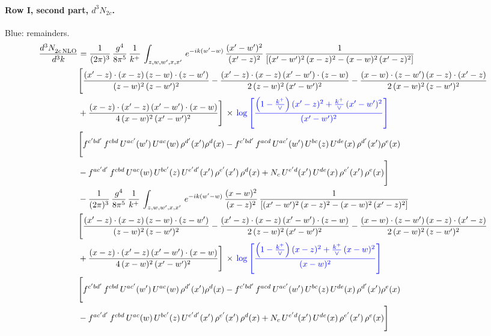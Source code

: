 \documentclass[10pt]{article}
\numberwithin{equation}{section}
\newcommand{\new}[1]{{\color{blue}#1}}
\begin{document}
\paragraph{Row I, second part, $d^3N_{2c}$.}
\new{Blue}: remainders.
\begin{align}
    \frac{d^{3}N_{2c\,\rm NLO}^{\rm}}{d^{3}k}  & =  \frac{1}{(2\pi)^{3}}\, \frac{g^{4}}{8\pi^{5}}\,\frac{1}{k^{+}}\,\int_{z,w,w^{\prime},x,x'}\, e^{-ik(w^{\prime}-w)}\,\frac{(x'-w')^{2}}{(x'-z)^{2}}\, \frac{1}{\left[(x'-w')^{2}\, (x-z)^{2} - (x-w)^{2}\, (x'-z)^{2}\right]} \notag \\ & \Bigg[\frac{(x'-z)\cdot (x-z)\, (z-w)\cdot (z-w')}{(z-w)^{2}\, (z-w')^{2}}-\frac{(x'-z)\cdot (x-z)\, (x'-w')\cdot (z-w)}{2\, (z-w)^{2}\, (x'-w')^{2}} -\frac{(x-w)\cdot (z-w')\, (x-z)\cdot (x'-z)}{2\, (x-w)^{2}\, (z-w')^{2}}\notag \\ & +\frac{(x-z)\cdot (x'-z)\, (x'-w')\cdot (x-w)}{4\, (x-w)^{2}\, (x'-w')^{2}}\Bigg]\,\times\, \new{\log{\left[\frac{\left(1-\frac{k^{+}}{\vee}\right)(x'-z)^{2}+\frac{k^{+}}{\vee}\,(x'-w')^{2}}{(x'-w')^{2}}\right]}} \notag \\ &  \Bigg[f^{c'bd'}\,f^{cbd}\, U^{ac'}(w')\,U^{ac}(w)\,\rho^{d'}(x')\rho^{d}(x)- f^{c'bd'}\,f^{acd}\,U^{ac'}(w')\,U^{bc}(z)\,U^{de}(x)\,\rho^{d'}(x')\rho^{e}(x) \notag \\ & -f^{ac'd'}\,f^{cbd}\,U^{ac}(w)\,U^{bc'}(z)\,U^{e'd'}(x')\,\rho^{e'}(x')\,\rho^{d}(x) +N_{c}\,U^{e'd}(x')\,U^{de}(x)\,\rho^{e'}(x')\,\rho^{e}(x)\Bigg] \notag \\
& -\frac{1}{(2\pi)^{3}}\, \frac{g^{4}}{8\pi^{5}}\,\frac{1}{k^{+}}\,\int_{z,w,w^{\prime},x,x'}\, e^{-ik(w^{\prime}-w)}\,\frac{(x-w)^{2}}{(x-z)^{2}}\, \frac{1}{\left[(x'-w')^{2}\, (x-z)^{2} - (x-w)^{2}\, (x'-z)^{2}\right]} \notag \\ & \Bigg[\frac{(x'-z)\cdot (x-z)\, (z-w)\cdot (z-w')}{(z-w)^{2}\, (z-w')^{2}}-\frac{(x'-z)\cdot (x-z)\, (x'-w')\cdot (z-w)}{2\, (z-w)^{2}\, (x'-w')^{2}} -\frac{(x-w)\cdot (z-w')\, (x-z)\cdot (x'-z)}{2\, (x-w)^{2}\, (z-w')^{2}}\notag \\ & +\frac{(x-z)\cdot (x'-z)\, (x'-w')\cdot (x-w)}{4\, (x-w)^{2}\, (x'-w')^{2}}\Bigg]\,\times\, \new{\log{\left[\frac{\left(1-\frac{k^{+}}{\vee}\right)(x-z)^{2}+\frac{k^{+}}{\vee}\,(x-w)^{2}}{(x-w)^{2}}\right]}} \notag \\ &  \Bigg[f^{c'bd'}\,f^{cbd}\, U^{ac'}(w')\,U^{ac}(w)\,\rho^{d'}(x')\rho^{d}(x)- f^{c'bd'}\,f^{acd}\,U^{ac'}(w')\,U^{bc}(z)\,U^{de}(x)\,\rho^{d'}(x')\rho^{e}(x) \notag \\ & -f^{ac'd'}\,f^{cbd}\,U^{ac}(w)\,U^{bc'}(z)\,U^{e'd'}(x')\,\rho^{e'}(x')\,\rho^{d}(x) +N_{c}\,U^{e'd}(x')\,U^{de}(x)\,\rho^{e'}(x')\,\rho^{e}(x)\Bigg] \label{eq:F:G2I2c}
\end{align}
\end{document}
